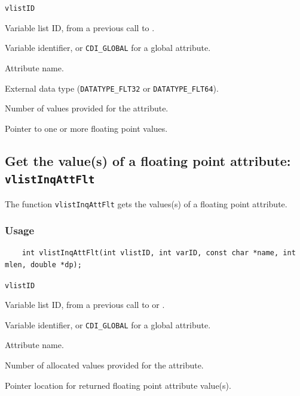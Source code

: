 \hspace*{4mm}\begin{minipage}[]{15cm}
\begin{deflist}{\tt vlistID\ }
\item[{\tt vlistID}]
Variable list ID, from a previous call to {}.
\item[{\tt varID}]
Variable identifier, or {\tt CDI\_GLOBAL} for a global attribute.
\item[{\tt name}]
Attribute name.
\item[{\tt type}]
External data type ({\tt DATATYPE\_FLT32} or {\tt DATATYPE\_FLT64}).
\item[{\tt len}]
Number of values provided for the attribute.
\item[{\tt dp}]
Pointer to one or more floating point values.

\end{deflist}
\end{minipage}


\subsection{Get the value(s) of a floating point attribute: {\tt vlistInqAttFlt}}
\label{vlistInqAttFlt}

The function {\tt vlistInqAttFlt} gets the values(s) of a floating point attribute.

\subsubsection*{Usage}

\begin{verbatim}
    int vlistInqAttFlt(int vlistID, int varID, const char *name, int mlen, double *dp);
\end{verbatim}

\hspace*{4mm}\begin{minipage}[]{15cm}
\begin{deflist}{\tt vlistID\ }
\item[{\tt vlistID}]
Variable list ID, from a previous call to {} or {}.
\item[{\tt varID}]
Variable identifier, or {\tt CDI\_GLOBAL} for a global attribute.
\item[{\tt name}]
Attribute name.
\item[{\tt mlen}]
Number of allocated values provided for the attribute.
\item[{\tt dp}]
Pointer location for returned floating point attribute value(s).

\end{deflist}
\end{minipage}


